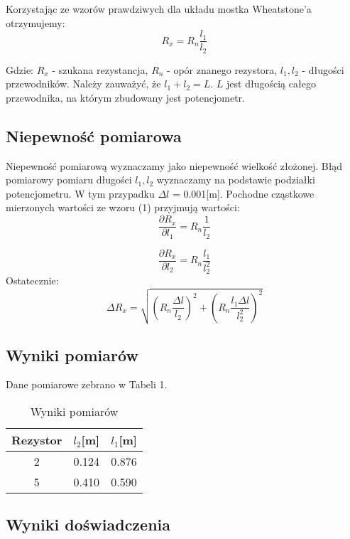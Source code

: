 \documentclass{article} %
\begin{document}
Korzystając ze wzorów prawdziwych dla układu mostka Wheatstone'a otrzymujemy:
{\large
\begin{equation}
    R_x = R_n\frac{l_1}{l_2}
\end{equation}}

Gdzie: $R_x$ - szukana rezystancja, $R_n$ - opór znanego rezystora, $l_1, l_2$ - długości przewodników. Należy zauważyć, że $l_1 + l_2 = L$. $L$ jest długością całego przewodnika, na którym zbudowany jest potencjometr.

\subsection{Niepewność pomiarowa}

Niepewność pomiarową wyznaczamy jako niepewność wielkość złożonej. Błąd pomiarowy pomiaru długości $l_1, l_2$ wyznaczamy na podstawie podziałki potencjometru. W tym przypadku $\Delta l$ = 0.001[m]. Pochodne cząstkowe mierzonych wartości ze wzoru (1) przyjmują wartości:
{\large
\begin{equation}
\frac{\partial R_x}{\partial l_1} = R_n\frac{1}{l_2}    
\end{equation}
}

{\large
\begin{equation}
\frac{\partial R_x}{\partial l_2} = R_n\frac{l_1}{l_2^2}    
\end{equation}
}
Ostatecznie:
{\large
\begin{equation}
\Delta R_x = \sqrt{(R_n\frac{\Delta l}{l_2} )^2+(R_n\frac{l_1\Delta l}{l_2^2})^2}   
\end{equation}
}
\subsection{Wyniki pomiarów}

Dane pomiarowe zebrano w Tabeli 1.
\begin{table}[h!]
\centering
\begin{tabular}{|c|c|c|}
\hline
\textbf{Rezystor} & \textbf{$l_2$[m]} & \textbf{$l_1$[m]} \\
\hline
 2 & 0.124 & 0.876 \\
 5 & 0.410 & 0.590 \\
\hline
\end{tabular}
\caption{Wyniki pomiarów}
\label{table:students}
\end{table}

\subsection{Wyniki doświadczenia}
\end{document}
